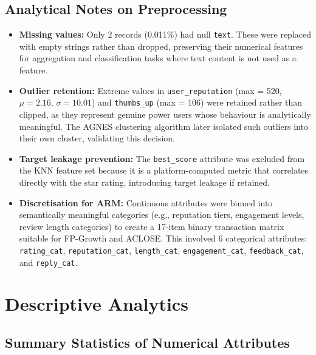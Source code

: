 \documentclass[12pt,a4paper]{article}
\begin{document}
\subsection{Analytical Notes on Preprocessing}

\begin{itemize}
    \item \textbf{Missing values:} Only 2 records (0.011\%) had null \texttt{text}. These were replaced with empty strings rather than dropped, preserving their numerical features for aggregation and classification tasks where text content is not used as a feature.
    \item \textbf{Outlier retention:} Extreme values in \texttt{user\_reputation} (max = 520, $\mu = 2.16$, $\sigma = 10.01$) and \texttt{thumbs\_up} (max = 106) were retained rather than clipped, as they represent genuine power users whose behaviour is analytically meaningful. The AGNES clustering algorithm later isolated such outliers into their own cluster, validating this decision.
    \item \textbf{Target leakage prevention:} The \texttt{best\_score} attribute was excluded from the KNN feature set because it is a platform-computed metric that correlates directly with the star rating, introducing target leakage if retained.
    \item \textbf{Discretisation for ARM:} Continuous attributes were binned into semantically meaningful categories (e.g., reputation tiers, engagement levels, review length categories) to create a 17-item binary transaction matrix suitable for FP-Growth and ACLOSE. This involved 6 categorical attributes: \texttt{rating\_cat}, \texttt{reputation\_cat}, \texttt{length\_cat}, \texttt{engagement\_cat}, \texttt{feedback\_cat}, and \texttt{reply\_cat}.
\end{itemize}

\section{Descriptive Analytics}

\subsection{Summary Statistics of Numerical Attributes}
\end{document}
